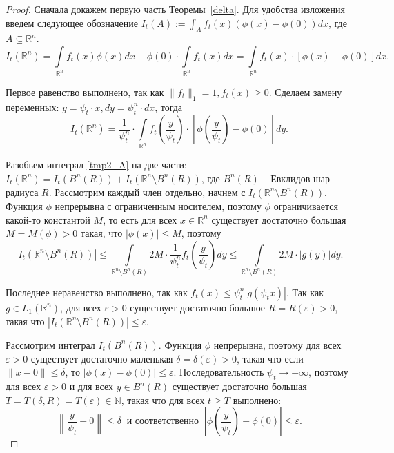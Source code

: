     \begin{proof}
        Сначала докажем первую часть Теоремы~\ref{delta}. Для удобства изложения введем следующее обозначение $I_t(A) := \int_{A} f_t(x) (\phi(x) - \phi(0) ) dx$, где $A \subseteq \mathbb{R}^n$.
        \begin{equation*}
            I_t\left(\mathbb{R}^n\right) = \int\limits_{\mathbb{R}^n} f_t(x) \phi(x) dx - \phi(0) \cdot \int\limits_{\mathbb{R}^n} f_t(x) dx = \int\limits_{\mathbb{R}^n} f_t(x) \cdot [\phi(x) - \phi(0)] dx.
        \end{equation*}
        
        Первое равенство выполнено, так как $\|f_t\|_1 = 1, f_t(x) \geq 0$.    
        Сделаем замену переменных: $y = \psi_t \cdot x, dy = \psi_t^n \cdot dx$, тогда 
        \begin{equation} \label{tmp2_A}
            I_t\left(\mathbb{R}^n\right) = \dfrac{1}{\psi_t^n} \cdot \int\limits_{\mathbb{R}^n} f_t\left(\frac{y}{\psi_t}\right) \cdot \left[\phi\left(\frac{y}{\psi_t}\right) - \phi(0)\right] dy.
        \end{equation}
        
        Разобьем интеграл \eqref{tmp2_A} на две части: $         I_t\left(\mathbb{R}^n\right) = I_t\left(B^n(R) \right) + I_t\left(\mathbb{R}^n \setminus B^n(R)\right)
        $, где $B^n(R)$ -- Евклидов шар радиуса $R$. Рассмотрим каждый член отдельно, начнем с $I_t\left(\mathbb{R}^n \setminus B^n(R) \right)$. Функция $\phi$ непрерывна с ограниченным носителем, поэтому $\phi$ ограничивается какой-то константой $M$, то есть для всех $x \in \mathbb{R}^n$ существует достаточно большая $M = M(\phi) > 0$ такая, что $|\phi(x)| \leq M$, поэтому 
        \begin{equation*}
            \left|I_t\left(\mathbb{R}^n \setminus B^n(R) \right)\right| \leq \int\limits_{\mathbb{R}^n \setminus B^n(R)} 2 M \cdot \dfrac{1}{\psi_t^n} f_t\left(\frac{y}{\psi_t}\right) dy 
            \leq \int\limits_{\mathbb{R}^n \setminus B^n(R)} 2 M \cdot |g(y)| dy .
        \end{equation*}
        
        Последнее неравенство выполнено, так как $f_t(x) \leq \psi_t^n |g(\psi_t x)|$. Так как $g \in L_1(\mathbb{R}^n)$, для всех $\varepsilon > 0$ существует достаточно большое $R = R(\varepsilon) > 0$, такая что $\left|I_t\left(\mathbb{R}^n \setminus B^n(R) \right)\right| \leq \varepsilon$.

        Рассмотрим интеграл $I_t\left(B^n(R) \right)$. Функция $\phi$ непрерывна, поэтому для всех $\varepsilon > 0$ существует достаточно маленькая $\delta = \delta(\varepsilon) > 0$, такая что если $\|x - 0\| \leq \delta$, то $|\phi(x) - \phi(0)| \leq \varepsilon$. Последовательность $\psi_t \to +\infty$, поэтому для всех $\varepsilon > 0$ и для всех $y \in B^n(R)$ существует достаточно большая $T = T(\delta, R) = T(\varepsilon) \in \mathbb{N}$, такая что для всех $t \geq T$ выполнено:
        \begin{equation*}
            \left\|\frac{y}{\psi_t} - 0\right\| \leq \delta ~\text{ и соответственно }~ \left|\phi\left(\frac{y}{\psi_t}\right) - \phi(0)\right| \leq \varepsilon.
        \end{equation*}
        

\end{proof}
